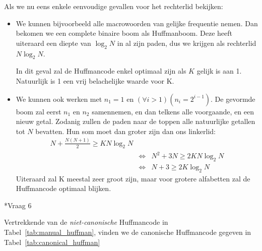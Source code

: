 \documentclass[]{article}
\begin{document}
\begin{section}
\begin{subsection}
        Als we nu eens enkele eenvoudige gevallen voor het rechterlid
        bekijken:

        \begin{itemize}
            \item We kunnen bijvoorbeeld alle macrowoorden van gelijke
                frequentie nemen. Dan bekomen we een complete binaire
                boom als Huffmanboom. Deze heeft uiteraard een diepte
                van $\log_2 N$ in al zijn paden, dus we krijgen als
                rechterlid $N \log_2 N$.

                In dit geval zal de Huffmancode enkel optimaal zijn als
                $K$ gelijk is aan 1. Natuurlijk is 1 een vrij
                belachelijke waarde voor K.
            \item We kunnen ook werken met $n_1 = 1$ en $(\forall i>1)
                (n_i = 2^{i-1})$. De gevormde boom zal eerst $n_1$ en
                $n_2$ samennemen, en dan telkens alle voorgaande, en
                een nieuw getal. Zodanig zullen de paden naar de toppen
                alle natuurlijke getallen tot $N$ bevatten. Hun som
                moet dan groter zijn dan ons linkerlid:
                \begin{eqnarray*}
                    N + \frac{N(N+1)}{2} \ge K N \log_2 N
                    \\ & \Leftrightarrow &
                    N^2 + 3N \ge 2KN \log_2 N
                    \\ & \Leftrightarrow &
                    N + 3 \ge 2K \log_2 N
                \end{eqnarray*}
                Uiteraard zal K meestal zeer groot zijn, maar voor
                grotere alfabetten zal de Huffmancode optimaal blijken.
        \end{itemize}

    \end{subsection}

    \begin{subsection}*{Vraag 6}

        Vertrekkende van de \emph{niet-canonische} Huffmancode in
        Tabel~\ref{tab:manual_huffman}, vinden we de canonische
        Huffmancode gegeven in Tabel~\ref{tab:canonical_huffman}


\end{subsection}
\end{section}
\end{document}

